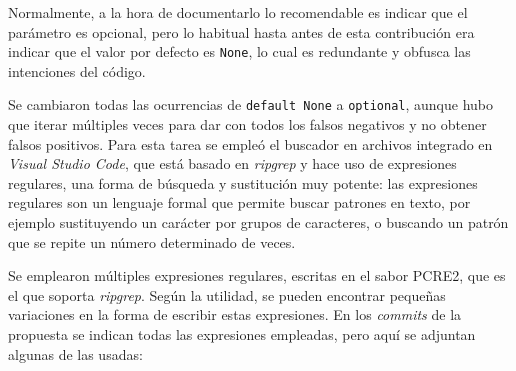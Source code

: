 Normalmente, a la hora de documentarlo lo recomendable es indicar que el \gls{parámetro} es opcional, pero lo habitual hasta antes de esta contribución era indicar que el valor por defecto es \texttt{None}, lo cual es redundante y obfusca las intenciones del código.

Se cambiaron todas las ocurrencias de \texttt{default None} a \texttt{optional}, aunque hubo que iterar múltiples veces para dar con todos los falsos negativos y no obtener falsos positivos. Para esta tarea se empleó el buscador en archivos integrado en \textit{Visual Studio Code}, que está basado en \textit{ripgrep} y hace uso de expresiones regulares, una forma de búsqueda y sustitución muy potente: las expresiones regulares son un lenguaje formal que permite buscar patrones en texto, por ejemplo sustituyendo un carácter por grupos de caracteres, o buscando un patrón que se repite un número determinado de veces.

Se emplearon múltiples expresiones regulares, escritas en el sabor PCRE2, que es el que soporta \textit{ripgrep}. Según la utilidad, se pueden encontrar pequeñas variaciones en la forma de escribir estas expresiones. En los \textit{commits} de la propuesta se indican todas las expresiones empleadas, pero aquí se adjuntan algunas de las usadas:

